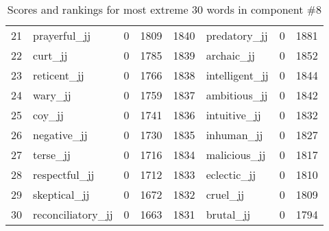 \begin{table}[tbp]
\begin{tabular}{| rlr@{.}l | rlr@{.}l |}
    21 & prayerful\_jj & 0 & 1809    &    1840 & predatory\_jj & 0 & 1881 \\
    22 & curt\_jj & 0 & 1785    &    1839 & archaic\_jj & 0 & 1852 \\
    23 & reticent\_jj & 0 & 1766    &    1838 & intelligent\_jj & 0 & 1844 \\
    24 & wary\_jj & 0 & 1759    &    1837 & ambitious\_jj & 0 & 1842 \\
    25 & coy\_jj & 0 & 1741    &    1836 & intuitive\_jj & 0 & 1832 \\
    26 & negative\_jj & 0 & 1730    &    1835 & inhuman\_jj & 0 & 1827 \\
    27 & terse\_jj & 0 & 1716    &    1834 & malicious\_jj & 0 & 1817 \\
    28 & respectful\_jj & 0 & 1712    &    1833 & eclectic\_jj & 0 & 1810 \\
    29 & skeptical\_jj & 0 & 1672    &    1832 & cruel\_jj & 0 & 1809 \\
    30 & reconciliatory\_jj & 0 & 1663    &    1831 & brutal\_jj & 0 & 1794 \\
    \hline
    \end{tabular}
    \caption{Scores and rankings for most extreme 30 words in component \#8} 
\end{table}
\clearpage
